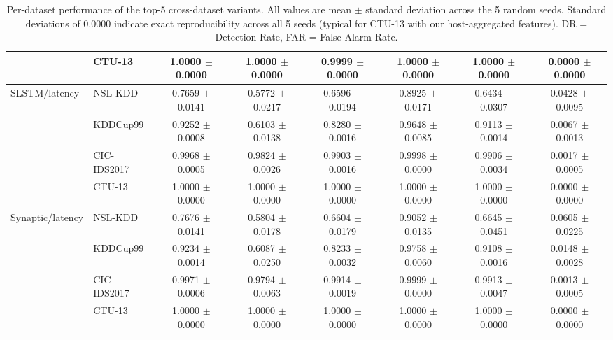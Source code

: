 \begin{table}[t]
{\begin{tabular}{llcccccc}
 & CTU-13 & 1.0000 $\pm$ 0.0000 & 1.0000 $\pm$ 0.0000 & 0.9999 $\pm$ 0.0000 & 1.0000 $\pm$ 0.0000 & 1.0000 $\pm$ 0.0000 & 0.0000 $\pm$ 0.0000 \\
\midrule
\multirow{4}{*}{SLSTM/latency} & NSL-KDD & 0.7659 $\pm$ 0.0141 & 0.5772 $\pm$ 0.0217 & 0.6596 $\pm$ 0.0194 & 0.8925 $\pm$ 0.0171 & 0.6434 $\pm$ 0.0307 & 0.0428 $\pm$ 0.0095 \\
 & KDDCup99 & 0.9252 $\pm$ 0.0008 & 0.6103 $\pm$ 0.0138 & 0.8280 $\pm$ 0.0016 & 0.9648 $\pm$ 0.0085 & 0.9113 $\pm$ 0.0014 & 0.0067 $\pm$ 0.0013 \\
 & CIC-IDS2017 & 0.9968 $\pm$ 0.0005 & 0.9824 $\pm$ 0.0026 & 0.9903 $\pm$ 0.0016 & 0.9998 $\pm$ 0.0000 & 0.9906 $\pm$ 0.0034 & 0.0017 $\pm$ 0.0005 \\
 & CTU-13 & 1.0000 $\pm$ 0.0000 & 1.0000 $\pm$ 0.0000 & 1.0000 $\pm$ 0.0000 & 1.0000 $\pm$ 0.0000 & 1.0000 $\pm$ 0.0000 & 0.0000 $\pm$ 0.0000 \\
\midrule
\multirow{4}{*}{Synaptic/latency} & NSL-KDD & 0.7676 $\pm$ 0.0141 & 0.5804 $\pm$ 0.0178 & 0.6604 $\pm$ 0.0179 & 0.9052 $\pm$ 0.0135 & 0.6645 $\pm$ 0.0451 & 0.0605 $\pm$ 0.0225 \\
 & KDDCup99 & 0.9234 $\pm$ 0.0014 & 0.6087 $\pm$ 0.0250 & 0.8233 $\pm$ 0.0032 & 0.9758 $\pm$ 0.0060 & 0.9108 $\pm$ 0.0016 & 0.0148 $\pm$ 0.0028 \\
 & CIC-IDS2017 & 0.9971 $\pm$ 0.0006 & 0.9794 $\pm$ 0.0063 & 0.9914 $\pm$ 0.0019 & 0.9999 $\pm$ 0.0000 & 0.9913 $\pm$ 0.0047 & 0.0013 $\pm$ 0.0005 \\
 & CTU-13 & 1.0000 $\pm$ 0.0000 & 1.0000 $\pm$ 0.0000 & 1.0000 $\pm$ 0.0000 & 1.0000 $\pm$ 0.0000 & 1.0000 $\pm$ 0.0000 & 0.0000 $\pm$ 0.0000 \\
\bottomrule
\end{tabular}%
}
\caption{Per-dataset performance of the top-5 cross-dataset variants. All values are mean $\pm$ standard deviation across the 5 random seeds. Standard deviations of 0.0000 indicate exact reproducibility across all 5 seeds (typical for CTU-13 with our host-aggregated features). DR = Detection Rate, FAR = False Alarm Rate.}
\label{tab:top5_per_dataset}
\end{table}
